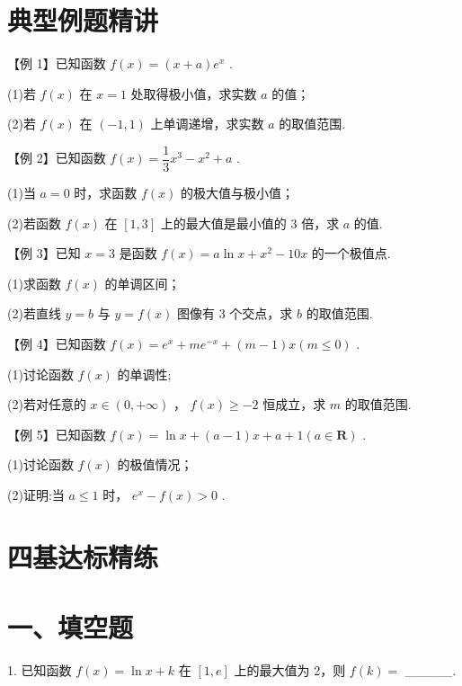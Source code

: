 \section*{典型例题精讲}

【例 1】已知函数 $f\left( x\right)  = \left( {x + a}\right) {{e}}^{x}$ .

(1)若 $f\left( x\right)$ 在 $x = 1$ 处取得极小值，求实数 $a$ 的值；

(2)若 $f\left( x\right)$ 在 $\left( {-1,1}\right)$ 上单调递增，求实数 $a$ 的取值范围.

【例 2】已知函数 $f\left( x\right)  = \dfrac{1}{3}{x}^{3} - {x}^{2} + a$ .

(1)当 $a = 0$ 时，求函数 $f\left( x\right)$ 的极大值与极小值；

(2)若函数 $f\left( x\right)$ 在 $\left\lbrack  {1,3}\right\rbrack$ 上的最大值是最小值的 3 倍，求 $a$ 的值.

【例 3】已知 $x = 3$ 是函数 $f\left( x\right)  = a\ln x + {x}^{2} - {10x}$ 的一个极值点.

(1)求函数 $f\left( x\right)$ 的单调区间；

(2)若直线 $y = b$ 与 $y = f\left( x\right)$ 图像有 3 个交点，求 $b$ 的取值范围.

【例 4】已知函数 $f\left( x\right)  = {{e}}^{x} + m{{e}}^{-x} + \left( {m - 1}\right) x\left( {m \leq  0}\right)$ .

(1)讨论函数 $f\left( x\right)$ 的单调性;

(2)若对任意的 $x \in  \left( {0, + \infty }\right)$ ， $f\left( x\right)  \geq   - 2$ 恒成立，求 $m$ 的取值范围.


【例 5】已知函数 $f\left( x\right)  = \ln x + \left( {a - 1}\right) x + a + 1\left( {a \in  \mathbf{R}}\right)$ .

(1)讨论函数 $f\left( x\right)$ 的极值情况；

(2)证明:当 $a \leq  1$ 时， ${{e}}^{x} - f\left( x\right)  > 0$ .

\section*{四基达标精练}

\section*{一、填空题}

1. 已知函数 $f\left( x\right)  = \ln x + k$ 在 $\left\lbrack  {1,{e}}\right\rbrack$ 上的最大值为 2，则 $f\left( k\right)  =$ \_\_\_\_\_.

